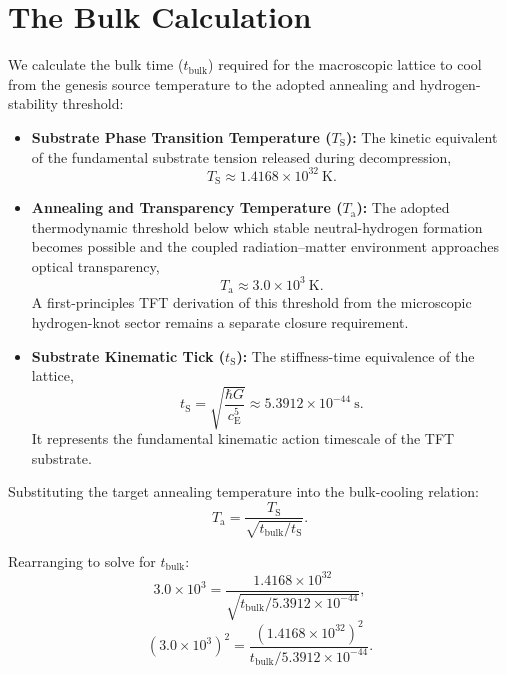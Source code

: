 \section{The Bulk Calculation}

We calculate the bulk time ($t_{\mathrm{bulk}}$) required for the macroscopic lattice to cool from the genesis source temperature to the adopted annealing and hydrogen-stability threshold:

\begin{itemize}
    \item \textbf{Substrate Phase Transition Temperature ($T_{\mathrm S}$):} The kinetic equivalent of the fundamental substrate tension released during decompression,
    \begin{equation}
        T_{\mathrm S} \approx 1.4168 \times 10^{32}\ \mathrm{K}.
    \end{equation}

    \item \textbf{Annealing and Transparency Temperature ($T_{\mathrm a}$):} The adopted thermodynamic threshold below which stable neutral-hydrogen formation becomes possible and the coupled radiation--matter environment approaches optical transparency,
    \begin{equation}
        T_{\mathrm a} \approx 3.0 \times 10^3\ \mathrm{K}.
    \end{equation}
    A first-principles TFT derivation of this threshold from the microscopic hydrogen-knot sector remains a separate closure requirement.

    \item \textbf{Substrate Kinematic Tick ($t_{\mathrm S}$):} The stiffness-time equivalence of the lattice,
    \begin{equation}
        t_{\mathrm S} = \sqrt{\frac{\hbar G}{c_{\mathrm E}^5}} \approx 5.3912 \times 10^{-44}\ \mathrm{s}.
    \end{equation}
    It represents the fundamental kinematic action timescale of the TFT substrate.
\end{itemize}

Substituting the target annealing temperature into the bulk-cooling relation:
\begin{equation}
    T_{\mathrm a} = \frac{T_{\mathrm S}}{\sqrt{t_{\mathrm{bulk}}/t_{\mathrm S}}}.
\end{equation}

Rearranging to solve for $t_{\mathrm{bulk}}$:
\begin{equation}
    3.0 \times 10^3 = \frac{1.4168 \times 10^{32}}{\sqrt{t_{\mathrm{bulk}} / 5.3912 \times 10^{-44}}},
\end{equation}
\begin{equation}
    (3.0 \times 10^3)^2 = \frac{(1.4168 \times 10^{32})^2}{t_{\mathrm{bulk}} / 5.3912 \times 10^{-44}}.
\end{equation}

